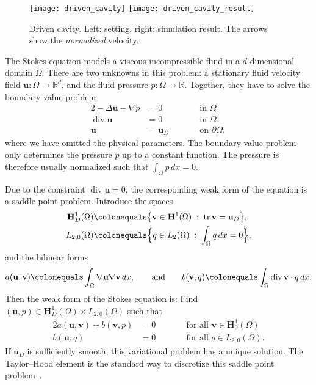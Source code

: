 \documentclass[a4paper,10pt,headings=normal,bibliography=totoc]{scrartcl}
\newcommand{\R}{\mathbb{R}}
\renewcommand{\div}{\operatorname{div}}
\begin{document}
\begin{figure}
 \begin{center}
  \texttt{[image: driven\_cavity]}
  \qquad
  \texttt{[image: driven\_cavity\_result]}
 \end{center}
 \caption{Driven cavity. Left: setting, right: simulation result.  The arrows show the {\em normalized} velocity.}
 \label{fig:driven_cavity}
\end{figure}

The Stokes equation models a viscous incompressible
fluid in a $d$-dimensional domain $\Omega$.  There are two unknowns in this problem: a stationary
fluid velocity field $\mathbf{u} : \Omega \to \R^d$, and the fluid pressure $p : \Omega \to \R$.
Together, they have to solve the boundary value problem
\begin{alignat*}{2}
 -\Delta \mathbf{u} - \nabla p & = 0  & \qquad & \text{in $\Omega$} \\
 \div \mathbf{u} & = 0                &        & \text{in $\Omega$} \\
                    \mathbf{u} & = \mathbf{u}_D  &        & \text{on $\partial \Omega$},
\end{alignat*}
where we have omitted the physical parameters.  The boundary value problem only determines the
pressure $p$ up to a constant function.  The pressure is therefore usually normalized such
that $\int_\Omega p\,dx = 0$.

Due to the constraint $\div \mathbf{u} = 0$, the corresponding weak form of the equation is a saddle-point problem.
Introduce the spaces
\begin{align*}
 \mathbf{H}^1_D(\Omega)
      & \colonequals
      \big\{ \mathbf{v} \in \mathbf{H}^1(\Omega) \; :\; \operatorname{tr}{\mathbf{v}} = \mathbf{u}_D \big\}, \\
 L_{2,0}(\Omega) & \colonequals  \Big\{ q \in L_2(\Omega) \; :\; \int_\Omega q\,dx = 0 \Big\},
\end{align*}
and the bilinear forms
\begin{equation*}
 a(\mathbf{u},\mathbf{v}) \colonequals \int_\Omega \nabla \mathbf{u} \nabla \mathbf{v} \,dx,
 \qquad \text{and} \qquad
 b(\mathbf{v},q) \colonequals \int_\Omega \div \mathbf{v} \cdot q \,dx.
\end{equation*}
Then the weak form of the Stokes equation is: Find $(\mathbf{u},p) \in \mathbf{H}_D^1(\Omega) \times L_{2,0}(\Omega)$ such that
\begin{alignat*}{2}
 a(\mathbf{u},\mathbf{v}) + b(\mathbf{v},p) & = 0 & \qquad & \text{for all $\mathbf{v} \in \mathbf{H}_0^1(\Omega)$} \\
 b(\mathbf{u},q)\qquad\qquad & = 0       &        & \text{for all $q \in L_{2,0}(\Omega)$}.
\end{alignat*}
If $\mathbf{u}_D$ is sufficiently smooth, this variational problem has a unique solution.
The Taylor--Hood element is the standard way to discretize this saddle point problem~\cite{braess:2013}.
\end{document}
